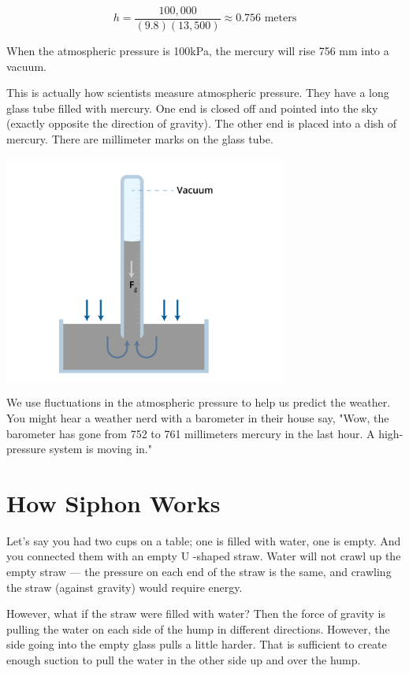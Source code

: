 $$h = \frac{100,000}{(9.8)(13,500)} \approx 0.756 \text{ meters}$$

When the atmospheric pressure is 100kPa,  the mercury will rise 756 mm into a vacuum.

This is actually how scientists measure atmospheric pressure. They have a long glass tube filled with mercury.  One end is closed off and pointed into the sky (exactly opposite the direction of gravity).  The other end is placed into a dish of mercury.  There are millimeter marks on the glass tube.

\includegraphics[width=0.7\textwidth]{barometer.png}


We use fluctuations in the atmospheric pressure to help us predict the weather.  You might hear a weather nerd with a barometer in their house say, "Wow, the barometer has gone from 752 to 761 millimeters mercury in the last hour.  A high-pressure system is moving in." 


\section{How Siphon Works}

Let's say you had two cups on a table; one is filled with water,  one is empty.  And you connected them with an empty U -shaped straw.  Water will not crawl up the empty straw ---  the pressure on each end of the straw is the same, and crawling the straw (against gravity) would require energy.

However, what if the straw were filled with water?  Then the force of gravity is pulling the water on each side of the hump in different directions.   However,  the side going into the empty glass pulls a little harder.  That is sufficient to create enough suction to pull the  water in the other side up and over the hump.

